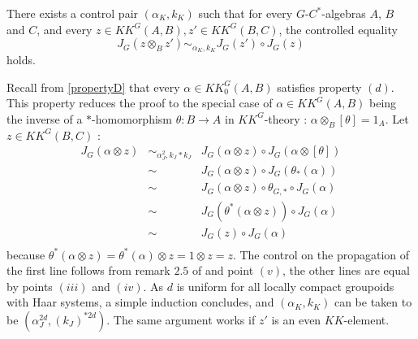 \begin{prop} There exists a control pair $(\alpha_K,k_K)$ such that for every $G$-$C^*$-algebras $A$, $B$ and $C$, and every $z\in KK^G(A,B),z'\in KK^G(B,C)$, the controlled equality
\[J_G(z\otimes_B z') \sim_{\alpha_K,k_K} J_G(z')\circ J_G(z)\]
holds.
\end{prop}
\begin{dem}
Recall from \ref{propertyD} that every $\alpha\in KK_0^G(A,B)$ satisfies property $(d)$. This property reduces the proof to the special case of $\alpha\in KK^G(A,B)$ being the inverse of a $*$-homomorphism $\theta : B\rightarrow A$ in $KK^G$-theory : $\alpha\otimes_B [\theta]=1_A$. Let $z\in KK^G(B,C)$ :
\[\begin{array}{rcl}
J_G (\alpha\otimes z) & \sim_{\alpha_J^2,k_J*k_J} &  J_G(\alpha\otimes z)\circ J_G(\alpha\otimes [\theta]) \\
			& \sim & J_G(\alpha\otimes z)\circ J_G(\theta_*(\alpha))\\
			& \sim & J_G(\alpha\otimes z)\circ \theta_{G,*}\circ J_G(\alpha)\\
			& \sim & J_G(\theta^*(\alpha\otimes z))\circ J_G(\alpha)\\
			& \sim & J_G(z)\circ J_G(\alpha) \\
\end{array}\] 
because $\theta^*(\alpha\otimes z)=\theta^*(\alpha)\otimes z=1\otimes z =z$. The control on the propagation of the first line follows from remark $2.5$ of \cite{OY2} and point $(v)$, the other lines are equal by points $(iii)$ and $(iv)$. As $d$ is uniform for all locally compact groupoids with Haar systems, a simple induction concludes, and $(\alpha_K,k_K)$ can be taken to be $( \alpha_J^{2d},( k_J)^{*2d})$. The same argument works if $z'$ is an even $KK$-element.\\


\end{dem}
